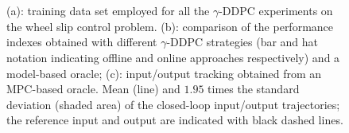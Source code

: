 \documentclass[letterpaper, 10 pt, conference]{ieeeconf}  %
\begin{document}
\begin{figure}[t!]
	\centering
  \\
 \\
 

	\caption{(a): training data set employed for all the $\gamma$-DDPC experiments on the wheel slip control problem. (b): comparison of the performance indexes obtained with different $\gamma$-DDPC strategies (bar and hat notation indicating offline and online approaches respectively) and a model-based oracle; (c): input/output tracking obtained from an MPC-based oracle. Mean (line) and $1.95$ times the standard deviation (shaded area) of the closed-loop input/output trajectories; the reference input and output are indicated with black dashed lines. 
 }
	\label{fig:BS_sims_tuned}
\end{figure}
\end{document}
